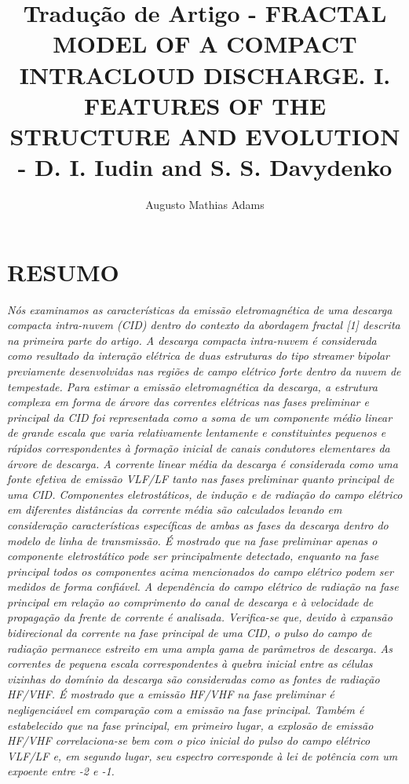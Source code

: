 \documentclass[a4paper, 12pt, onecolumn,singlespacing]{article}
\title{Tradução de Artigo - FRACTAL MODEL OF A COMPACT INTRACLOUD DISCHARGE. I. FEATURES OF THE STRUCTURE AND EVOLUTION - D. I. Iudin and S. S. Davydenko}
\author[1]{Augusto Mathias Adams}
\affil[1]{augusto.adams@ufpr.br}
\begin{document}
	
	\maketitle

	\section{RESUMO}
	
\textit{	Nós examinamos as características da emissão eletromagnética de uma descarga compacta intra-nuvem (CID) dentro do contexto da abordagem fractal [1] descrita na primeira parte do artigo. A descarga compacta intra-nuvem é considerada como resultado da interação elétrica de duas estruturas do tipo streamer bipolar previamente desenvolvidas nas regiões de campo elétrico forte dentro da nuvem de tempestade. Para estimar a emissão eletromagnética da descarga, a estrutura complexa em forma de árvore das correntes elétricas nas fases preliminar e principal da CID foi representada como a soma de um componente médio linear de grande escala que varia relativamente lentamente e constituintes pequenos e rápidos correspondentes à formação inicial de canais condutores elementares da árvore de descarga. A corrente linear média da descarga é considerada como uma fonte efetiva de emissão VLF/LF tanto nas fases preliminar quanto principal de uma CID. Componentes eletrostáticos, de indução e de radiação do campo elétrico em diferentes distâncias da corrente média são calculados levando em consideração características específicas de ambas as fases da descarga dentro do modelo de linha de transmissão. É mostrado que na fase preliminar apenas o componente eletrostático pode ser principalmente detectado, enquanto na fase principal todos os componentes acima mencionados do campo elétrico podem ser medidos de forma confiável. A dependência do campo elétrico de radiação na fase principal em relação ao comprimento do canal de descarga e à velocidade de propagação da frente de corrente é analisada. Verifica-se que, devido à expansão bidirecional da corrente na fase principal de uma CID, o pulso do campo de radiação permanece estreito em uma ampla gama de parâmetros de descarga. As correntes de pequena escala correspondentes à quebra inicial entre as células vizinhas do domínio da descarga são consideradas como as fontes de radiação HF/VHF. É mostrado que a emissão HF/VHF na fase preliminar é negligenciável em comparação com a emissão na fase principal. Também é estabelecido que na fase principal, em primeiro lugar, a explosão de emissão HF/VHF correlaciona-se bem com o pico inicial do pulso do campo elétrico VLF/LF e, em segundo lugar, seu espectro corresponde à lei de potência com um expoente entre -2 e -1.}
	
\end{document}
